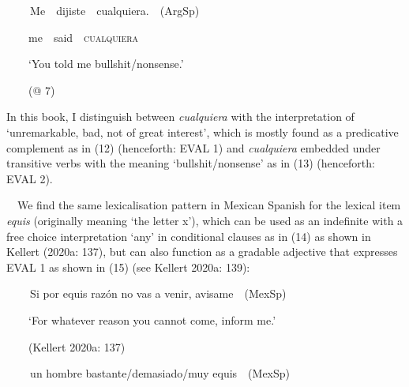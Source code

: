 \clearpage\begin{styleStandard}
\textbf{\ \ }\ \ Me\ \ dijiste\ \ cualquiera.\ \ (ArgSp)
\end{styleStandard}

\begin{styleStandard}
\ \ \ \ me\ \ said\ \ \textsc{cualquiera} \ \ 
\end{styleStandard}

\begin{styleStandard}
\ \ \ \ ‘You told me bullshit/nonsense.’
\end{styleStandard}

\begin{styleStandard}
\ \ \ \ (@ 7)
\end{styleStandard}

\begin{styleStandard}
In this book, I distinguish between \textit{cualquiera} with the interpretation of ‘unremarkable, bad, not of great interest’, which is mostly found as a predicative complement as in (12) (henceforth: EVAL 1) and \textit{cualquiera} embedded under transitive verbs with the meaning ‘bullshit/nonsense’ as in (13) (henceforth: EVAL 2).
\end{styleStandard}

\begin{styleStandard}
\ \ We find the same lexicalisation pattern in Mexican Spanish for the lexical item \textit{equis} (originally meaning ‘the letter x’), which can be used as an indefinite with a free choice interpretation ‘any’ in conditional clauses as in (14) as shown in Kellert (2020a: 137), but can also function as a gradable adjective that expresses EVAL 1 as shown in (15) (see Kellert 2020a: 139):
\end{styleStandard}

\clearpage\begin{styleStandard}
\textbf{\ \ }\ \ Si por equis razón no vas a venir, avisame\ \ (MexSp)
\end{styleStandard}

\begin{styleStandard}
\ \ \ \ ‘For whatever reason you cannot come, inform me.’\ \ 
\end{styleStandard}

\begin{styleStandard}
\ \ \ \ (Kellert 2020a: 137)
\end{styleStandard}

\clearpage\begin{styleStandard}
\textbf{\ \ }\ \ un hombre bastante/demasiado/muy equis\ \ (MexSp)
\end{styleStandard}

